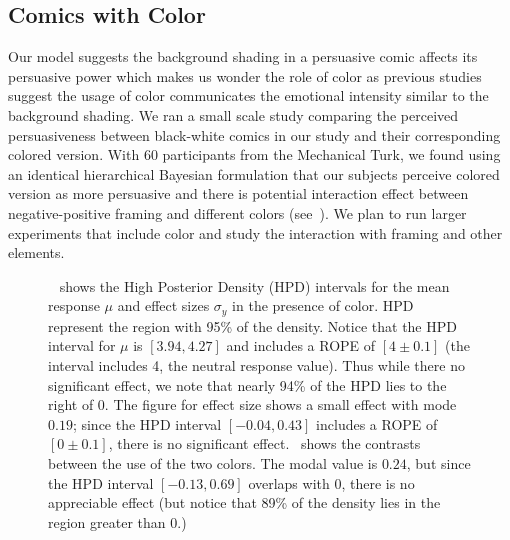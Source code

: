 \subsection{Comics with Color}
Our model suggests the background shading in a persuasive comic affects its persuasive power which makes us wonder the role of color as previous studies suggest the usage of color communicates the emotional intensity similar to the background shading. We ran a small scale study comparing the perceived persuasiveness between black-white comics in our study and their corresponding colored version. With 60 participants from the Mechanical Turk,  we found using an identical hierarchical Bayesian formulation that our subjects perceive colored version as more persuasive and there is potential interaction effect between negative-positive framing and different colors (see~). We plan to run larger experiments that include color and study the interaction with framing and other elements.

\begin{figure}
  \hfill
 \caption{~ shows the High Posterior Density (HPD) intervals for the mean response $\mu$ and effect sizes $\sigma_y$ in the presence of color. HPD represent the region with 95\% of the density. Notice that the HPD interval for $\mu$ is $[3.94, 4.27]$ and includes a ROPE of $[4\pm 0.1]$ (the interval includes 4, the neutral response value). Thus while there no significant effect, we note that nearly 94\% of the HPD lies to the right of 0. The figure for effect size shows a small effect with mode $0.19$; since the HPD interval $[-0.04, 0.43]$ includes a ROPE of $[0\pm 0.1]$, there is no significant effect.~ shows the contrasts between the use of the two colors. The modal value is $0.24$, but since the HPD interval $[-0.13, 0.69]$ overlaps with 0, there is no appreciable effect (but notice that 89\% of the density lies in the region greater than 0.)}
 \label{fig:color-experiment-effect}
\end{figure}


